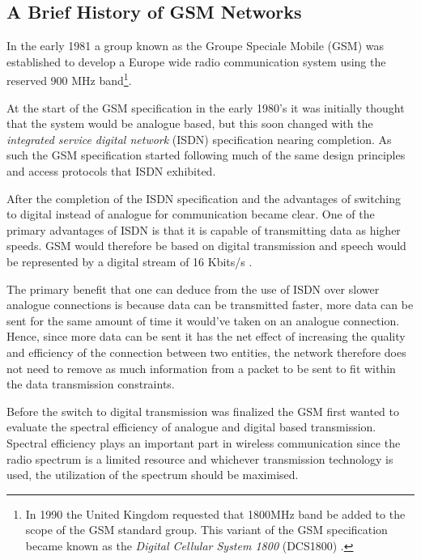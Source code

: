 \subsection{A Brief History of GSM Networks}
\label{sec:gsmhistory}
In the early 1981 a group known as the Groupe Speciale Mobile (GSM) was established to develop a Europe wide radio communication system using the reserved 900 MHz band\footnote{In 1990 the United Kingdom requested that 1800MHz band be added to the scope of the GSM standard group. This variant of the GSM specification became known as the \emph{Digital Cellular System 1800} (DCS1800) \cite{GSM92,Karen2004}.}\cite{GSM92,Karen2004}.

At the start of the GSM specification in the early 1980's it was initially thought that the system would be analogue based, but this soon changed with the \emph{integrated service digital network} (ISDN) specification nearing completion. As such the GSM specification started following much of the same design principles and access protocols that ISDN exhibited\cite{Karen2004,GSM92,GSMArchitectureProtocolsServices}.

After the completion of the ISDN specification and the advantages of switching to digital instead of analogue for communication became clear. One of the primary advantages of ISDN is that it is capable of transmitting data as higher speeds. GSM would therefore be based on digital transmission and speech would be represented by a digital stream of 16 Kbits/s \cite{Karen2004,GSM92,GSMArchitectureProtocolsServices}.

The primary benefit that one can deduce from the use of ISDN over slower analogue connections is because data can be transmitted faster, more data can be sent for the same amount of time it would've taken on an analogue connection\cite{Karen2004,GSM92,GSMArchitectureProtocolsServices}. Hence, since more data can be sent it has the net effect of increasing the quality and efficiency of the connection between two entities, the network therefore does not need to remove as much information from a packet to be sent to fit within the data transmission constraints\cite{Karen2004,GSM92,GSMArchitectureProtocolsServices}.

Before the switch to digital transmission was finalized the GSM first wanted to evaluate the spectral efficiency of analogue and digital based transmission\cite{Karen2004,GSM92,GSMArchitectureProtocolsServices}. Spectral efficiency plays an important part in wireless communication since the radio spectrum is a limited resource and whichever transmission technology is used, the utilization of the spectrum should be maximised\cite{Karen2004,GSM92,GSMArchitectureProtocolsServices}. 

